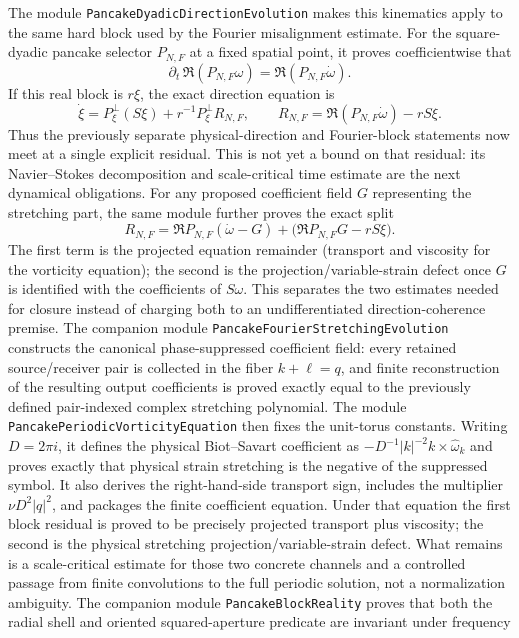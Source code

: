 \documentclass[11pt]{article}
\theoremstyle{definition}
\begin{document}
The module \texttt{PancakeDyadicDirectionEvolution} makes this kinematics
apply to the same hard block used by the Fourier misalignment estimate.  For
the square-dyadic pancake selector $P_{N,F}$ at a fixed spatial point, it proves
coefficientwise that
\[
 \partial_t\,\Re(P_{N,F}\omega)
   =\Re(P_{N,F}\dot\omega).
\]
If this real block is $r\xi$, the exact direction equation is
\[
 \dot\xi=P_\xi^\perp(S\xi)+r^{-1}P_\xi^\perp R_{N,F},
 \qquad
R_{N,F}=\Re(P_{N,F}\dot\omega)-rS\xi.
\]
Thus the previously separate physical-direction and Fourier-block statements
now meet at a single explicit residual.  This is not yet a bound on that
residual: its Navier--Stokes decomposition and scale-critical time estimate
are the next dynamical obligations.
For any proposed coefficient field $G$ representing the stretching part, the
same module further proves the exact split
\[
 R_{N,F}=\Re P_{N,F}(\dot\omega-G)
   +\bigl(\Re P_{N,F}G-rS\xi\bigr).
\]
The first term is the projected equation remainder (transport and viscosity
for the vorticity equation); the second is the projection/variable-strain
defect once $G$ is identified with the coefficients of $S\omega$.  This
separates the two estimates needed for closure instead of charging both to an
undifferentiated direction-coherence premise.
The companion module \texttt{PancakeFourierStretchingEvolution} constructs
the canonical phase-suppressed coefficient field: every retained
source/receiver pair is collected in the
fiber $k+\ell=q$, and finite reconstruction of the resulting output
coefficients is proved exactly equal to the previously defined pair-indexed
complex stretching polynomial.  The module
\texttt{PancakePeriodicVorticityEquation} then fixes the unit-torus constants.
Writing $D=2\pi i$, it defines the physical Biot--Savart coefficient as
$-D^{-1}|k|^{-2}k\times\widehat\omega_k$ and proves exactly that physical
strain stretching is the negative of the suppressed symbol.  It also derives
the right-hand-side transport sign, includes the multiplier
$\nu D^2|q|^2$, and packages the finite coefficient equation.  Under that
equation the first block residual is proved to be precisely projected
transport plus viscosity; the second is the physical stretching
projection/variable-strain defect.  What remains is a scale-critical estimate
for those two concrete channels and a controlled passage from finite
convolutions to the full periodic solution, not a normalization ambiguity.
The companion module \texttt{PancakeBlockReality} proves that both the radial
shell and oriented squared-aperture predicate are invariant under frequency
\end{document}
